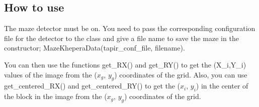 \subsection{How to use}
\label{sec:mkd:howto}

The maze detector must be on. You need to pass the corresponding 
configuration file for the detector to the class and give a file name 
to save the maze in the constructor; MazeKheperaData(tapir\_conf\_file,
filename). 

You can then use the functions get\_RX() and get\_RY() to get the (X\_i,Y\_i) 
values of the image from the ($x_g$, $y_g$) coordinates of the grid. Also, 
you can use get\_centered\_RX() and get\_centered\_RY() to get the 
($x_i$, $y_i$) 
in the center of the block in the image from the ($x_g$, $y_g$) coordinates 
of the grid.

